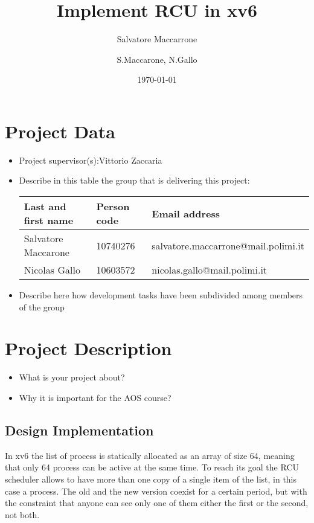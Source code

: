 \documentclass{article}
\author{Salvatore Maccarrone}
\author{S.Maccarone, N.Gallo}
\date{\today}
\title{Implement RCU in xv6}
\begin{document}
\maketitle
\tableofcontents


\section{Project Data}
\begin{itemize}
\item 
  Project supervisor(s):Vittorio Zaccaria
\item 
Describe in this table the group that is delivering this project:

\begin{center}
\begin{tabular}{lll}
Last and first name & Person code & Email address\\
\hline
  Salvatore Maccarone & 10740276 & salvatore.maccarrone@mail.polimi.it \\
  Nicolas Gallo & 10603572 & nicolas.gallo@mail.polimi.it                     
\end{tabular}
\end{center}
\item
Describe here how development tasks have been subdivided among members
of the group

\end{itemize}



\section{Project Description}

\begin{itemize}
\item What is your project about?
\item Why it is important for the AOS course?
\end{itemize}

\subsection{Design Implementation}

In xv6 the list of process is statically allocated as an array of size 64, meaning that only 64 process can be active at the same time. To reach its goal the RCU scheduler allows to have more than one copy of a single item of the list, in this case a process. The old and the new version coexist for a certain period, but with the constraint that anyone can see only one of them either the first or the second, not both. 
\end{document}
